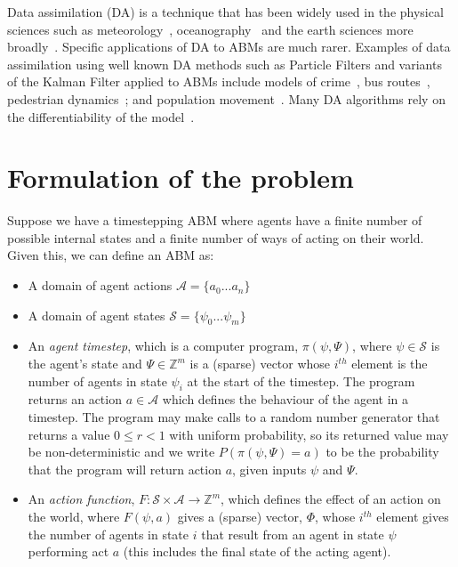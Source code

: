\documentclass{article}
\begin{document}
Data assimilation (DA) is a technique that has been widely used in the physical sciences such as meteorology~\cite{kalnay_atmospheric_2003}, oceanography~\cite{bertino_sequential_2003} and the earth sciences more broadly~\cite{reichle_data_2008}. Specific applications of DA to ABMs are much rarer. Examples of data assimilation using well known DA methods such as Particle Filters and variants of the Kalman Filter applied to ABMs include models of crime~\cite{lloyd_exploring_2016}, bus routes~\cite{kieu_dealing_2020}, pedestrian dynamics~\cite{wang_data_2015, ward_dynamic_2016, clay_realtime_2020, malleson_simulating_2020};
and population movement~\cite{lueck_who_2019}. Many DA algorithms rely on the differentiability of the model~\cite{lewis_dynamic_2006}.

\section{Formulation of the problem}


Suppose we have a timestepping ABM where agents have a finite number of possible internal states and a finite number of ways of acting on their world. Given this, we can define an ABM as:
\begin{itemize}
	\item A domain of agent actions $\mathcal{A} =\{ a_0 ... a_n \}$
	
	\item A domain of agent states $\mathcal{S} = \{\psi_0 ... \psi_m\}$
	
	\item An \textit{agent timestep}, which is a computer program, $\pi(\psi,\Psi)$, where $\psi \in \mathcal{S}$ is the agent's state and $\Psi \in \mathbb{Z}^m$ is a (sparse) vector whose $i^{th}$ element is the number of agents in state $\psi_i$ at the start of the timestep. The program returns an action $a \in \mathcal{A}$ which defines the behaviour of the agent in a timestep. The program may make calls to a random number generator that returns a value $0 \le r < 1$ with uniform probability, so its returned value may be non-deterministic and we write $P(\pi(\psi,\Psi)=a)$ to be the probability that the program will return action $a$, given inputs $\psi$ and $\Psi$. 
	
	\item An \textit{action function}, $F: \mathcal{S} \times \mathcal{A} \to \mathbb{Z}^m$, which defines the effect of an action on the world, where $F(\psi, a)$ gives a (sparse) vector, $\Phi$, whose $i^{th}$ element gives the number of agents in state $i$ that result from an agent in state $\psi$ performing act $a$ (this includes the final state of the acting agent).
\end{itemize}
\end{document}
